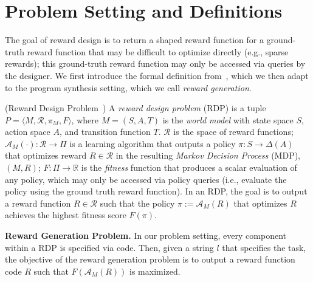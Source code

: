 \section{Problem Setting and Definitions}
The goal of reward design is to return a shaped reward function for a ground-truth reward function that may be difficult to optimize directly (e.g., sparse rewards); this ground-truth reward function may only be accessed via queries by the designer.  We first introduce the formal definition from~\citet{singh2010where}, which we then adapt to the program synthesis setting, which we call \textit{reward generation}. 

\begin{definition} 
\label{def:rdp}
(Reward Design Problem~\citep{singh2010where}) A \emph{reward design problem} (RDP) is a tuple $P = \langle M, \mathcal{R}, \pi_M, F \rangle$, where $M = (S,A,T)$ is the \textit{world model} with state space $S$, action space $A$, and transition function $T$. $\mathcal{R}$ is the space of reward functions; $\mathcal{A}_M(\cdot): \mathcal{R} \rightarrow \Pi$ is a learning algorithm that outputs a policy $\pi:S \rightarrow \Delta(A)$ that optimizes reward $R \in \mathcal{R}$ in the resulting \textit{Markov Decision Process} (MDP), $(M,R)$; $F: \Pi \rightarrow \mathbb{R}$ is the \textit{fitness} function that produces a scalar evaluation of any policy, which may only be accessed via policy queries (i.e., evaluate the policy using the ground truth reward function). In an RDP, the goal is to output a reward function $R \in \mathcal{R}$ 
such that the policy $\pi:=\mathcal{A}_M(R)$ that optimizes $R$ achieves the highest fitness score $F(\pi)$.
\end{definition}


\textbf{Reward Generation Problem.} In our problem setting, every component within a RDP is specified via code. 
Then, given a string $l$ that specifies the task, the objective of the reward generation problem is to output a reward function code $R$ such that $F(\mathcal{A}_{M}(R))$ is maximized. 









